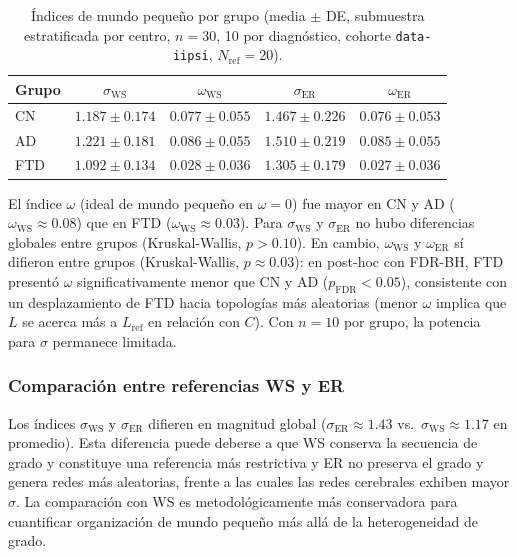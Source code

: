 \documentclass[12pt,a4paper]{article}
\begin{document}
\begin{table}[H]
  \centering
  \caption{Índices de mundo pequeño por grupo (media $\pm$ DE, submuestra estratificada por
  centro, $n = 30$, 10 por diagnóstico, cohorte \texttt{data-iipsi}, $N_{\text{ref}} = 20$).}
  \label{tab:small_world}
  \begin{tabular}{lcccc}
    \toprule
    Grupo & $\sigma_{\text{WS}}$ & $\omega_{\text{WS}}$ & $\sigma_{\text{ER}}$ & $\omega_{\text{ER}}$ \\
    \midrule
    CN & $1.187 \pm 0.174$ & $0.077 \pm 0.055$ & $1.467 \pm 0.226$ & $0.076 \pm 0.053$ \\
    AD & $1.221 \pm 0.181$ & $0.086 \pm 0.055$ & $1.510 \pm 0.219$ & $0.085 \pm 0.055$ \\
    FTD & $1.092 \pm 0.134$ & $0.028 \pm 0.036$ & $1.305 \pm 0.179$ & $0.027 \pm 0.036$ \\
    \bottomrule
  \end{tabular}
\end{table}

El índice $\omega$ (ideal de mundo pequeño en $\omega = 0$) fue mayor en CN y AD ($\omega_{\text{WS}} \approx 0.08$) que en FTD ($\omega_{\text{WS}} \approx 0.03$). Para $\sigma_{\text{WS}}$ y $\sigma_{\text{ER}}$ no hubo diferencias globales entre grupos (Kruskal-Wallis, $p > 0.10$). En cambio, $\omega_{\text{WS}}$ y $\omega_{\text{ER}}$ sí difieron entre grupos (Kruskal-Wallis, $p \approx 0.03$): en post-hoc con FDR-BH, FTD presentó $\omega$ significativamente menor que CN y AD ($p_{\text{FDR}} < 0.05$), consistente con un desplazamiento de FTD hacia topologías más aleatorias (menor $\omega$ implica que $L$ se acerca más a $L_{\text{ref}}$ en relación con $C$). Con $n = 10$ por grupo, la potencia para
$\sigma$ permanece limitada.

\subsubsection{Comparación entre referencias WS y ER}

Los índices $\sigma_{\text{WS}}$ y $\sigma_{\text{ER}}$ difieren en magnitud global ($\sigma_{\text{ER}} \approx 1.43$ vs.\ $\sigma_{\text{WS}} \approx 1.17$ en promedio). Esta diferencia puede deberse a que WS conserva la secuencia de grado y constituye una referencia más restrictiva y ER no preserva el grado y genera redes más aleatorias, frente a las cuales las redes cerebrales exhiben mayor $\sigma$. La comparación con WS es metodológicamente más conservadora para cuantificar organización de mundo pequeño más allá de la heterogeneidad de grado\cite{watts1998}.
\end{document}

